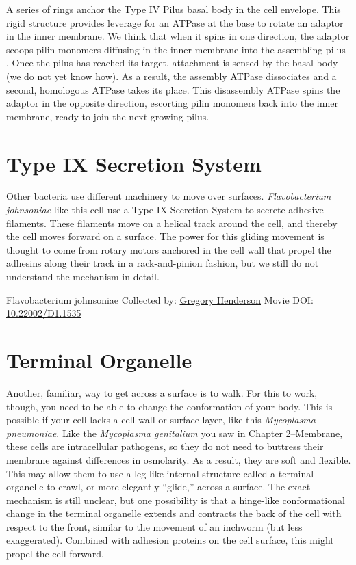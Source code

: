 \documentclass[]{tufte-book}
\begin{document}
A series of rings anchor the Type IV Pilus basal body in the cell envelope. This rigid structure provides leverage for an ATPase at the base to rotate an adaptor in the inner membrane. We think that when it spins in one direction, the adaptor scoops pilin monomers diffusing in the inner membrane into the assembling pilus \citep{chang2016}. Once the pilus has reached its target, attachment is sensed by the basal body (we do not yet know how). As a result, the assembly ATPase dissociates and a second, homologous ATPase takes its place. This disassembly ATPase spins the adaptor in the opposite direction, escorting pilin monomers back into the inner membrane, ready to join the next growing pilus.

\hypertarget{type-ix-secretion-system}{%
\section{Type IX Secretion System}\label{type-ix-secretion-system}}

Other bacteria use different machinery to move over surfaces. \emph{Flavobacterium johnsoniae} like this cell use a Type IX Secretion System to secrete adhesive filaments. These filaments move on a helical track around the cell, and thereby the cell moves forward on a surface. The power for this gliding movement is thought to come from rotary motors anchored in the cell wall that propel the adhesins along their track in a rack-and-pinion fashion, but we still do not understand the mechanism in detail.



\hypertarget{htmlwidget-a778809391539050c0b7}{}

\label{fig:6-11}Flavobacterium johnsoniae Collected by: \protect\hyperlink{gregory_henderson}{Gregory Henderson} Movie DOI: \href{https://doi.org/10.22002/D1.1535}{10.22002/D1.1535}

\hypertarget{terminal-organelle}{%
\section{Terminal Organelle}\label{terminal-organelle}}

Another, familiar, way to get across a surface is to walk. For this to work, though, you need to be able to change the conformation of your body. This is possible if your cell lacks a cell wall or surface layer, like this \emph{Mycoplasma pneumoniae}. Like the \emph{Mycoplasma genitalium} you saw in Chapter 2--Membrane, these cells are intracellular pathogens, so they do not need to buttress their membrane against differences in osmolarity. As a result, they are soft and flexible. This may allow them to use a leg-like internal structure called a terminal organelle to crawl, or more elegantly ``glide,'' across a surface. The exact mechanism is still unclear, but one possibility is that a hinge-like conformational change in the terminal organelle extends and contracts the back of the cell with respect to the front, similar to the movement of an inchworm (but less exaggerated). Combined with adhesion proteins on the cell surface, this might propel the cell forward.
\end{document}
